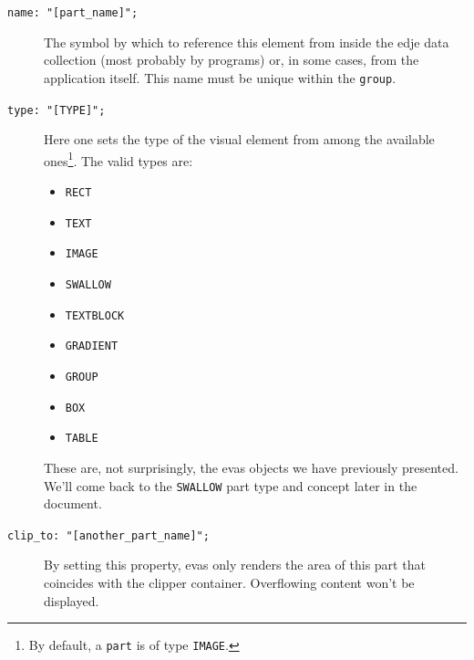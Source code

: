 \documentclass[a4paper]{profusion}
\begin{document}
\begin{description}
\item[\texttt{name: "[part\_name]";}] The symbol by which to reference
  this element from inside the edje data collection (most probably by
  programs) or, in some cases, from the application itself. This name
  must be unique within the \texttt{group}.

\item[\texttt{type: "[TYPE]";}] Here one sets the type of the visual
  element from among the available ones\footnote{By default, a
    \texttt{part} is of type \texttt{IMAGE}.}. The valid types are:
  \begin{itemize}
  \item \texttt{RECT}
  \item \texttt{TEXT}
  \item \texttt{IMAGE}
  \item \texttt{SWALLOW}
  \item \texttt{TEXTBLOCK}
  \item \texttt{GRADIENT}
  \item \texttt{GROUP}
  \item \texttt{BOX}
  \item \texttt{TABLE}
  \end{itemize}

These are, not surprisingly, the evas objects we have previously
presented.  We'll come back to the \texttt{SWALLOW} part type and
concept later in the document. %



\item[\texttt{clip\_to: "[another\_part\_name]";}] By setting this
  property, evas only renders the area of this part that coincides
  with the clipper container. Overflowing content won't be displayed.

\end{description}
\end{document}
